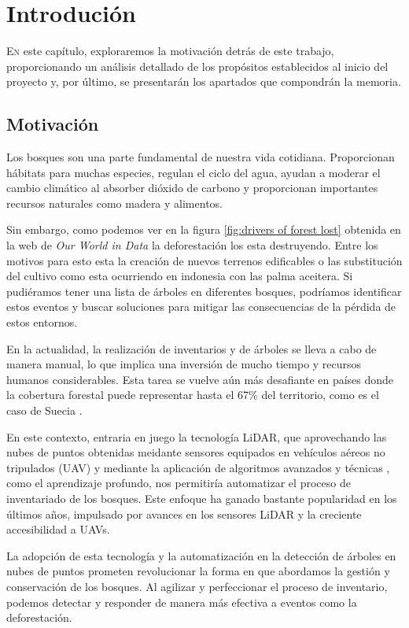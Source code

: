 \chapter{Introdución}
\label{chap:introducion}

\lettrine{E}{n} este capítulo, exploraremos la motivación detrás de este trabajo, proporcionando un análisis detallado de los propósitos establecidos al inicio del proyecto y, por último, se presentarán los apartados que compondrán la memoria.



\section{Motivación}
\label{sec:motivacion}
Los bosques son una parte fundamental de nuestra vida cotidiana. Proporcionan hábitats para muchas especies, regulan el ciclo del agua, ayudan a moderar el cambio climático al absorber dióxido de carbono y proporcionan importantes recursos naturales como  madera y  alimentos.

Sin embargo, como podemos ver en la figura \ref{fig:drivers of forest lost} obtenida en la web de \textit{Our World in Data} \cite{owidforestsanddeforestation} la deforestación los esta destruyendo. Entre los motivos para esto esta la creación de nuevos terrenos edificables o las substitución del cultivo como esta ocurriendo en indonesia con las palma aceitera. Si pudiéramos tener una lista de  árboles en diferentes bosques, podríamos identificar estos eventos y buscar soluciones para mitigar las consecuencias de la pérdida de estos entornos.

En la actualidad, la realización de inventarios y  de árboles se lleva a cabo de manera manual, lo que implica una inversión de mucho tiempo y recursos humanos considerables. Esta tarea se vuelve aún más desafiante en países donde la cobertura forestal puede representar hasta el 67\% del territorio, como es el caso de Suecia \cite{sweeden}.

En este contexto, entraria en juego la tecnología LiDAR, que aprovechando las nubes de puntos obtenidas meidante sensores equipados en vehículos aéreos no tripulados (UAV) y mediante la aplicación de algoritmos avanzados y técnicas , como el aprendizaje profundo, nos permitiría automatizar el proceso de inventariado de los bosques. Este enfoque ha ganado  bastante popularidad en los últimos años, impulsado por avances en los sensores LiDAR y la creciente accesibilidad a UAVs.

La adopción de esta tecnología y la automatización en la detección de árboles en nubes de puntos prometen revolucionar la forma en que abordamos la gestión y conservación de los bosques. Al agilizar y perfeccionar el proceso de inventario, podemos detectar y responder de manera más efectiva a eventos como la deforestación.

